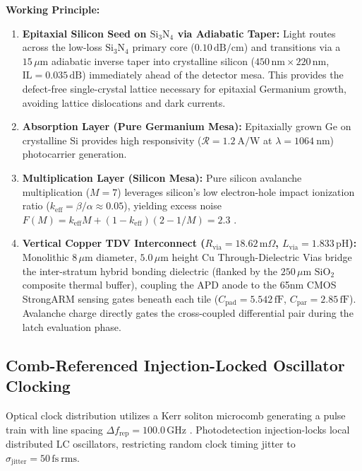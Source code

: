 \documentclass[journal]{IEEEtran}
\begin{document}
\textbf{Working Principle:}
\begin{enumerate}
    \item \textbf{Epitaxial Silicon Seed on $\mathrm{Si_3N_4}$ via Adiabatic Taper:} Light routes across the low-loss $\mathrm{Si_3N_4}$ primary core ($0.10\,\mathrm{dB/cm}$) and transitions via a $15\,\mu\mathrm{m}$ adiabatic inverse taper into crystalline silicon ($450\,\mathrm{nm} \times 220\,\mathrm{nm}$, $\mathrm{IL} = 0.035\,\mathrm{dB}$) immediately ahead of the detector mesa. This provides the defect-free single-crystal lattice necessary for epitaxial Germanium growth, avoiding lattice dislocations and dark currents.
    \item \textbf{Absorption Layer (Pure Germanium Mesa):} Epitaxially grown Ge on crystalline Si provides high responsivity ($\mathcal{R} = 1.2~\mathrm{A/W}$ at $\lambda = 1064~\mathrm{nm}$) photocarrier generation.
    \item \textbf{Multiplication Layer (Silicon Mesa):} Pure silicon avalanche multiplication ($M = 7$) leverages silicon's low electron-hole impact ionization ratio ($k_{\mathrm{eff}} = \beta/\alpha \approx 0.05$), yielding excess noise $F(M) = k_{\mathrm{eff}} M + (1 - k_{\mathrm{eff}})(2 - 1/M) = 2.3$ \cite{Campbell2007}\cite{Sze2006}.
    \item \textbf{Vertical Copper TDV Interconnect ($R_{\mathrm{via}} = 18.62\,\mathrm{m}\Omega$, $L_{\mathrm{via}} = 1.833\,\mathrm{pH}$):} Monolithic $8\,\mu\mathrm{m}$ diameter, $5.0\,\mu\mathrm{m}$ height Cu Through-Dielectric Vias bridge the inter-stratum hybrid bonding dielectric (flanked by the $250\,\mu\mathrm{m}$ $\mathrm{SiO_2}$ composite thermal buffer), coupling the APD anode to the 65nm CMOS StrongARM sensing gates beneath each tile ($C_{\mathrm{pad}} = 5.542\,\mathrm{fF}$, $C_{\mathrm{par}} = 2.85\,\mathrm{fF}$). Avalanche charge directly gates the cross-coupled differential pair during the latch evaluation phase.
\end{enumerate}

\subsection{Comb-Referenced Injection-Locked Oscillator Clocking}
Optical clock distribution utilizes a Kerr soliton microcomb generating a pulse train with line spacing $\Delta f_{\mathrm{rep}} = 100.0\,\mathrm{GHz}$ \cite{Suh2016}\cite{Kippenberg2018}. Photodetection injection-locks local distributed LC oscillators, restricting random clock timing jitter to $\sigma_{\mathrm{jitter}} = 50\,\mathrm{fs~rms}$.
\end{document}
